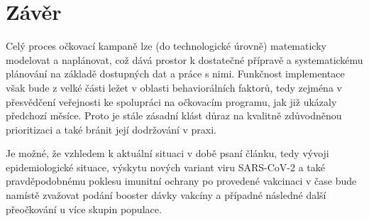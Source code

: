 \section*{Závěr}

Celý proces očkovací kampaně lze (do technologické úrovně) matematicky modelovat a naplánovat, což dává prostor k dostatečné přípravě a systematickému plánování na základě dostupných dat a práce s nimi. Funkčnost implementace však bude z velké části ležet v oblasti behaviorálních faktorů, tedy zejména v přesvědčení veřejnosti ke spolupráci na očkovacím programu, jak již ukázaly předchozí měsíce. 
%
Proto je stále zásadní klást důraz na kvalitně zdůvodněnou prioritizaci a také bránit její dodržování v praxi. %

Je možné, že vzhledem k aktuální situaci v době psaní článku, tedy vývoji epidemiologické situace, výskytu nových variant viru SARS-CoV-2 a také pravděpodobnému poklesu imunitní ochrany po provedené vakcinaci v čase bude namístě zvažovat podání booster dávky vakcíny a případné následné další přeočkování u více skupin populace. %

